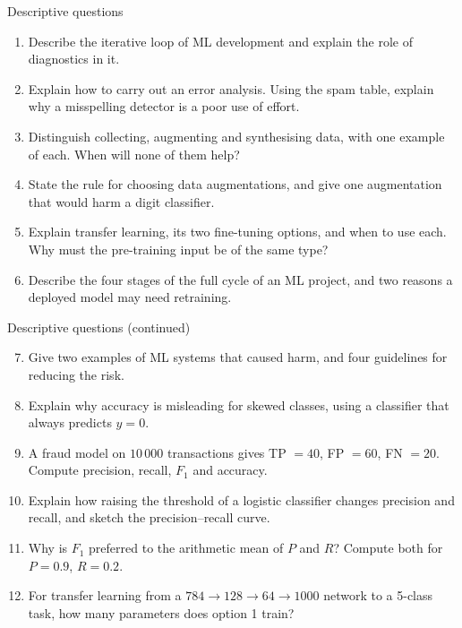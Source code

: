 \documentclass[aspectratio=169,10pt]{beamer}
\begin{document}
\begin{frame}{Descriptive questions}
  \footnotesize
  \begin{enumerate}
    \item Describe the iterative loop of ML development and explain the role of
          diagnostics in it. \hfill{}
    \item Explain how to carry out an error analysis. Using the spam table, explain why a
          misspelling detector is a poor use of effort. \hfill{}
    \item Distinguish collecting, augmenting and synthesising data, with one example of
          each. When will none of them help? \hfill{}
    \item State the rule for choosing data augmentations, and give one augmentation that
          would harm a digit classifier. \hfill{}
    \item Explain transfer learning, its two fine-tuning options, and when to use each. Why
          must the pre-training input be of the same type? \hfill{}
    \item Describe the four stages of the full cycle of an ML project, and two reasons a
          deployed model may need retraining. \hfill{}
  \end{enumerate}
\end{frame}

\begin{frame}{Descriptive questions (continued)}
  \footnotesize
  \begin{enumerate}\setcounter{enumi}{6}
    \item Give two examples of ML systems that caused harm, and four guidelines for reducing
          the risk. \hfill{}
    \item Explain why accuracy is misleading for skewed classes, using a classifier that
          always predicts $y=0$. \hfill{}
    \item A fraud model on $10\,000$ transactions gives TP $=40$, FP $=60$, FN $=20$.
          Compute precision, recall, $F_1$ and accuracy. \hfill{}
    \item Explain how raising the threshold of a logistic classifier changes precision and
          recall, and sketch the precision--recall curve. \hfill{}
    \item Why is $F_1$ preferred to the arithmetic mean of $P$ and $R$? Compute both for
          $P=0.9$, $R=0.2$. \hfill{}
    \item For transfer learning from a $784\to128\to64\to1000$ network to a 5-class task,
          how many parameters does option 1 train? \hfill{}
  \end{enumerate}
\end{frame}
\end{document}
